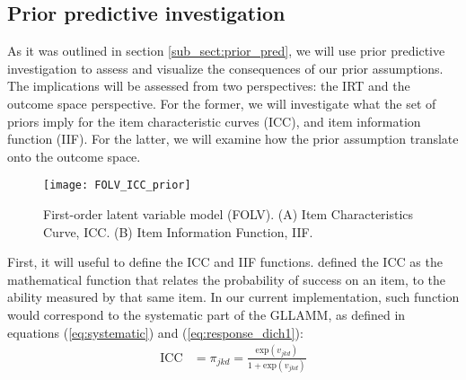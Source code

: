 \begin{comment}
On the other hand, from the texts and items perspective, at the level of the items (level-2) we would have $(25 \times 26)/2 = 325$ pieces of information available, corresponding to the variances and covariances of the items dimensions. With that information we would need to estimate $30$ parameters, corresponding to $25$ items' dimension variances, and $5$ texts' dimension variances. notice in this case, we do not need to estimate $25$ loadings, as they are assumed to be $1$.
\end{comment}


\subsection{Prior predictive investigation} \label{sub_sect:prior_pred_inv}

As it was outlined in section \ref{sub_sect:prior_pred}, we will use prior predictive investigation to assess and visualize the consequences of our prior assumptions. The implications will be assessed from two perspectives: the IRT and the outcome space perspective. For the former, we will investigate what the set of priors imply for the item characteristic curves (ICC), and item information function (IIF). For the latter, we will examine how the prior assumption translate onto the outcome space.
%
\begin{figure}[H]
	\centering
	\texttt{[image: FOLV\_ICC\_prior]}
	\caption[First-order latent variable model (FOLV). Item Characteristic Curve (ICC) and Item Information Function (IIF).]%
	{First-order latent variable model (FOLV). (A) Item Characteristics Curve, ICC. (B) Item Information Function, IIF.}
	\label{fig:FOLV_ICC_prior}
\end{figure} 

First, it will useful to define the ICC and IIF functions. \citet{Hambleton_et_al_1991b} defined the ICC as the mathematical function that relates the probability of success on an item, to the ability measured by that same item. In our current implementation, such function would correspond to the systematic part of the GLLAMM, as defined in equations (\ref{eq:systematic}) and (\ref{eq:response_dich1}):
%
\begin{equation} \label{eq:ICC}
	\begin{split}
		\text{ICC} &= \pi_{jkd} = \frac{ \text{exp}(v_{jkd}) }{ 1 + \text{exp}(v_{jkd}) }
	\end{split}	
\end{equation}

